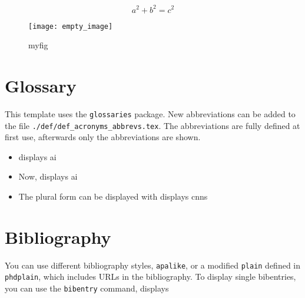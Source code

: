 \documentclass[../PhD_main.tex]{subfiles}
\begin{document}
\begin{equation}\label{eq:howto:myeq}
a^2 + b^2 = c^2
\end{equation}

\begin{figure}
\centering
\texttt{[image: empty\_image]}
\caption{myfig}\label{fig:howto:myfig}
\end{figure}

\section{Glossary}
\label{sec:howto:glossary}
This template uses the \texttt{glossaries} package. New abbreviations can be added to the file \texttt{./def/def\_acronyms\_abbrevs.tex}. The abbreviations are fully defined at first use, afterwards only the abbreviations are shown.

\begin{itemize}
	\item \texttt{} displays \gls{ai}
	\item Now, \texttt{} displays \gls{ai}
	\item The plural form can be displayed with \texttt{} displays \glspl{cnn}
\end{itemize}

\section{Bibliography}
You can use different bibliography styles, \eg \texttt{apalike}, or a modified \texttt{plain} defined in \texttt{phdplain}, which includes URLs in the bibliography.
To display single bibentries, you can use the \texttt{bibentry} command, \eg \texttt{} displays\\
\end{document}
